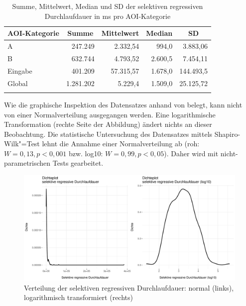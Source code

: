 


\begin{table}
    \begin{tabular}{lrrrr}
    \lsptoprule
        {AOI-Kategorie} & \multicolumn{1}{c}{Summe} & \multicolumn{1}{c}{Mittelwert} & \multicolumn{1}{c}{Median} &\multicolumn{1}{c}{SD} \\ 
        \midrule
        A &   247.249 &  2.332,54   &   994,0 &  3.883,06 \\
        B &   632.744 &  4.793,52 &  2.600,5  & 7.454,11 \\
        Eingabe  &  401.209 & 57.315,57   & 1.678,0 & 144.493,5 \\ 
        \midrule
        Global &  1.281.202  & 5.229,4 &  1.509,0 &  25.125,72 \\
        \lspbottomrule
    \end{tabular}
    \caption[Summe, Mittelwert, Median und SD der selektiven regressiven Durchlaufdauer]{Summe, Mittelwert, Median und SD der selektiven regressiven Durchlaufdauer in ms pro AOI-Kategorie}
    \label{K6:tab:DeDe:mean-sd-iaselregpd}
\end{table}



Wie die graphische Inspektion des Datensatzes anhand von  belegt, kann nicht von einer Normalverteilung ausgegangen werden. Eine logarithmische Transformation (rechte Seite der Abbildung) ändert nichts an dieser Beobachtung. Die statistische Untersuchung des Datensatzes mittels Shapiro-Wilk"=Test lehnt die Annahme einer Normalverteilung ab (roh: $W = 0,13, p < 0,001$ bzw. log10: $W = 0,99, p < 0,05$). Daher wird mit nicht-parametrischen Tests gearbeitet.


\begin{figure}
    \includegraphics[width=\textwidth]{Figures/EyeTracking/DD/ggplot_DD-SELECT-RegPD_density_de}
	\caption[Verteilung der selektiven regressiven Durchlaufdauer]
            {Verteilung der selektiven regressiven Durchlaufdauer: normal 
             (links), logarithmisch transformiert (rechts)\label{K6:fig:DeDe:density-iaselregpd}}
\end{figure}

